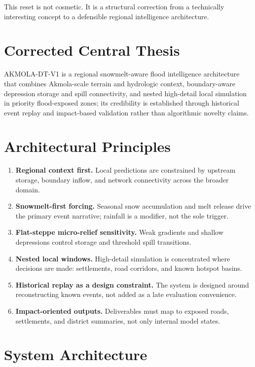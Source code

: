 \documentclass[11pt]{article}
\begin{document}
This reset is not cosmetic. It is a structural correction from a technically interesting concept to a defensible regional intelligence architecture.

\section{Corrected Central Thesis}

AKMOLA-DT-V1 is a regional snowmelt-aware flood intelligence architecture that combines Akmola-scale terrain and hydrologic context, boundary-aware depression storage and spill connectivity, and nested high-detail local simulation in priority flood-exposed zones; its credibility is established through historical event replay and impact-based validation rather than algorithmic novelty claims.

\section{Architectural Principles}

\begin{enumerate}[leftmargin=1.5em,itemsep=0.35em]
  \item \textbf{Regional context first.} Local predictions are constrained by upstream storage, boundary inflow, and network connectivity across the broader domain.
  \item \textbf{Snowmelt-first forcing.} Seasonal snow accumulation and melt release drive the primary event narrative; rainfall is a modifier, not the sole trigger.
  \item \textbf{Flat-steppe micro-relief sensitivity.} Weak gradients and shallow depressions control storage and threshold spill transitions.
  \item \textbf{Nested local windows.} High-detail simulation is concentrated where decisions are made: settlements, road corridors, and known hotspot basins.
  \item \textbf{Historical replay as a design constraint.} The system is designed around reconstructing known events, not added as a late evaluation convenience.
  \item \textbf{Impact-oriented outputs.} Deliverables must map to exposed roads, settlements, and district summaries, not only internal model states.
\end{enumerate}

\section{System Architecture}
\end{document}

